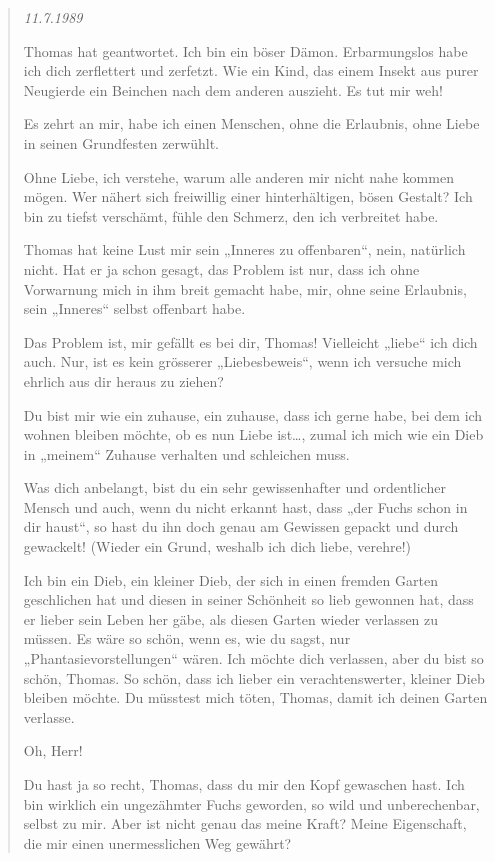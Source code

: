 \documentclass[10pt,a5paper]{book}
\newenvironment{tg}{\begin{quote}\em}{\end{quote}}
\begin{document}
\begin{tg}
11.7.1989

Thomas hat geantwortet. Ich bin ein böser Dämon. Erbarmungslos habe ich dich zerflettert und zerfetzt. Wie ein Kind, das einem Insekt aus purer Neugierde ein Beinchen nach dem anderen auszieht. Es tut mir weh!

Es zehrt an mir, habe ich einen Menschen, ohne die Erlaubnis, ohne Liebe in seinen Grundfesten zerwühlt.

Ohne Liebe, ich verstehe, warum alle anderen mir nicht nahe kommen mögen. Wer nähert sich freiwillig einer hinterhältigen, bösen Gestalt? Ich bin zu tiefst verschämt, fühle den Schmerz, den ich verbreitet habe. 

Thomas hat keine Lust mir sein „Inneres zu offenbaren“, nein, natürlich nicht. Hat er ja schon gesagt, das Problem ist nur, dass ich ohne Vorwarnung mich in ihm breit gemacht habe, mir, ohne seine Erlaubnis, sein „Inneres“ selbst offenbart habe.

Das Problem ist, mir gefällt es bei dir, Thomas! Vielleicht „liebe“ ich dich auch. Nur, ist es kein grösserer „Liebesbeweis“, wenn ich versuche mich ehrlich aus dir heraus zu ziehen?

Du bist mir wie ein zuhause, ein zuhause, dass ich gerne habe, bei dem ich wohnen bleiben möchte, ob es nun Liebe ist\dots , zumal ich mich wie ein Dieb in „meinem“ Zuhause verhalten und schleichen muss.

Was dich anbelangt, bist du ein sehr gewissenhafter und ordentlicher Mensch und auch, wenn du nicht erkannt hast, dass „der Fuchs schon in dir haust“, so hast du ihn doch genau am Gewissen gepackt und durch gewackelt! (Wieder ein Grund, weshalb ich dich liebe, verehre!)

Ich bin ein Dieb, ein kleiner Dieb, der sich in einen fremden Garten geschlichen hat und diesen in seiner Schönheit so lieb gewonnen hat, dass er lieber sein Leben her gäbe, als diesen Garten wieder verlassen zu müssen. Es wäre so schön, wenn es, wie du sagst, nur „Phantasievorstellungen“ wären. Ich möchte dich verlassen, aber du bist so schön, Thomas. So schön, dass ich lieber ein verachtenswerter, kleiner Dieb bleiben möchte. Du müsstest mich töten, Thomas, damit ich deinen Garten verlasse.

Oh, Herr!

Du hast ja so recht, Thomas, dass du mir den Kopf gewaschen hast. 
 Ich bin wirklich ein ungezähmter Fuchs geworden, so wild und unberechenbar, selbst zu mir. Aber ist nicht genau das meine Kraft? Meine Eigenschaft, die mir einen unermesslichen Weg gewährt?
 

\end{tg}
\end{document}
